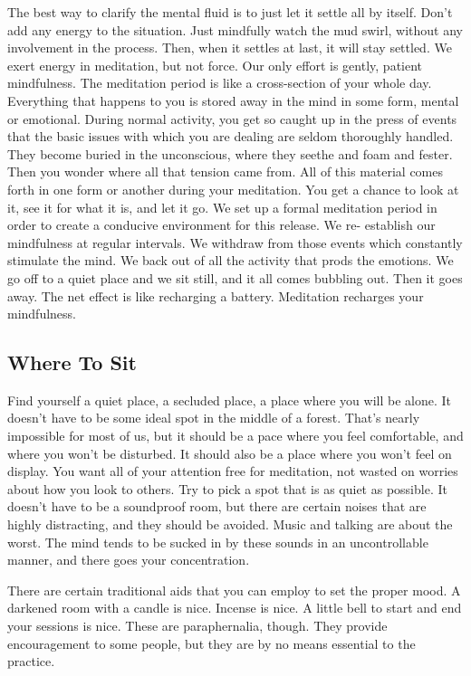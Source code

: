 The best way to clarify the mental fluid is to just let it settle all by itself.
Don't add any energy to the situation. Just mindfully watch the mud swirl,
without any involvement in the process. Then, when it settles at last, it will
stay settled. We exert energy in meditation, but not force. Our only effort is gently, patient mindfulness.
The meditation period is like a cross-section of your whole day. Everything that happens to you is stored away in the mind in
some form, mental or emotional. During normal activity, you get so caught up in the press of events that the basic issues with
which you are dealing are seldom thoroughly handled. They become buried in the unconscious, where they seethe and foam and
fester. Then you wonder where all that tension came from. All of this material comes forth in one form or another during your
meditation. You get a chance to look at it, see it for what it is, and let it go. We set up a formal meditation period in order to
create a conducive environment for this release. We re- establish our mindfulness at regular intervals. We withdraw from those
events which constantly stimulate the mind. We back out of all the activity that prods the emotions. We go off to a quiet place
and we sit still, and it all comes bubbling out. Then it goes away. The net effect is like recharging a battery. Meditation recharges
your mindfulness.

\subsection*{Where To Sit}
Find yourself a quiet place, a secluded place, a place where you
will be alone. It doesn't have to be some ideal spot in the middle of a forest.
That's nearly impossible for most of us, but it should be a pace where you feel
comfortable, and where you won't be disturbed. It should also be a place where
you won't feel on display. You want all of your attention free for meditation,
not wasted on worries about how you look to others. Try to pick a spot that is
as quiet as possible. It doesn't have to be a soundproof room, but there are
certain noises that are highly distracting, and they should be avoided. Music
and talking are about the worst. The mind tends to be sucked in by these sounds
in an uncontrollable manner, and there goes your concentration.

There are certain traditional aids that you can employ to set the proper mood. A
darkened room with a candle is nice. Incense is nice. A little bell to start and
end your sessions is nice. These are paraphernalia, though. They provide
encouragement to some people, but they are by no means essential to the
practice.

